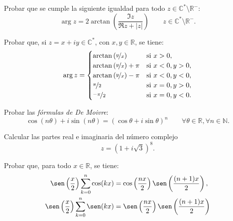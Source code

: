 \begin{ejercicio}
    Probar que se cumple la siguiente igualdad para todo $z \in \mathbb{C}^\ast \setminus \mathbb{R}^-$:
    \[
        \arg z = 2\arctan\left(\dfrac{\Im z}{\Re z + |z|}\right)\qquad z\in \mathbb{C}^\ast \setminus \mathbb{R}^-.
    \]
\end{ejercicio}

\begin{ejercicio}
    Probar que, si $z = x+iy \in \mathbb{C}^*$, con $x,y \in \mathbb{R}$, se tiene:
    \[
        \arg z = \begin{cases}
            \arctan\left(\nicefrac{y}{x}\right) & \text{si } x > 0, \\
            \arctan\left(\nicefrac{y}{x}\right) + \pi & \text{si } x < 0, y > 0, \\
            \arctan\left(\nicefrac{y}{x}\right) - \pi & \text{si } x < 0, y < 0, \\
            \nicefrac{\pi}{2} & \text{si } x = 0, y > 0, \\
            \nicefrac{-\pi}{2} & \text{si } x = 0, y < 0.
        \end{cases}
    \]
\end{ejercicio}

\begin{ejercicio}
    Probar las \emph{fórmulas de De Moivre}:
    \[
        \cos(n\theta) + i\sin(n\theta) = (\cos\theta + i\sin\theta)^n \qquad \forall \theta \in \mathbb{R}, \forall n \in \mathbb{N}.
    \]
\end{ejercicio}

\begin{ejercicio}
    Calcular las partes real e imaginaria del número complejo
    \[
        z=\left(1+i\sqrt{3}\right)^8.
    \]
\end{ejercicio}

\begin{ejercicio}
    Probar que, para todo $x \in \mathbb{R}$, se tiene:
    \begin{align}
        \sen\left(\frac{x}{2}\right)\sum_{k=0}^n \cos(kx) &= \cos \left(\dfrac{nx}{2}\right) \sen\left(\dfrac{(n+1)x}{2}\right), \\
        \sen\left(\frac{x}{2}\right)\sum_{k=0}^n \sen(kx) &= \sen \left(\dfrac{nx}{2}\right) \sen\left(\dfrac{(n+1)x}{2}\right)
    \end{align}
\end{ejercicio}